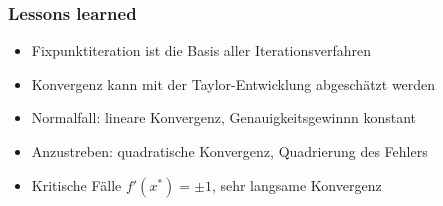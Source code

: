 %
%
%
\begin{frame}
\frametitle{Lessons learned}
\begin{itemize}[<+->]
\item Fixpunktiteration ist die Basis aller Iterationsverfahren
\item Konvergenz kann mit der Taylor-Entwicklung abgeschätzt werden
\item Normalfall: lineare Konvergenz, Genauigkeitsgewinnn konstant
\item Anzustreben: quadratische Konvergenz, Quadrierung des Fehlers
\item Kritische Fälle $f'(x^*)=\pm 1$, sehr langsame Konvergenz
\end{itemize}
\end{frame}
